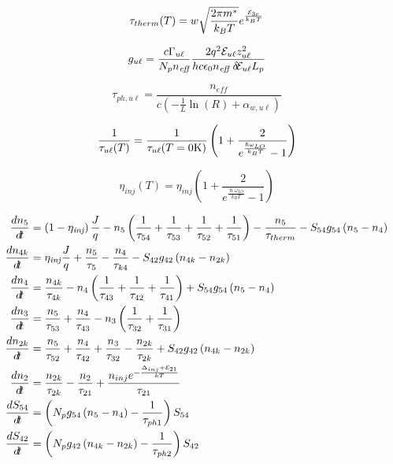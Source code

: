 \documentclass[12pt,twoside]{report}
\begin{document}
\begin{equation}
\tau_{therm}(T) = w \sqrt{\frac{2\pi m^*}{k_B T}} e^{\frac{\EE_{3c}}{k_B T}}
\end{equation}

\begin{equation}
g_{u\ell} = \frac{c \Gamma_{u\ell}}{N_p n_\textit{eff}} \frac{2 q^2 \EE_{u\ell} z_{u\ell}^2}{h c \epsilon_0 n_\textit{eff} \; \delta\!\EE_{u\ell} L_p}
\end{equation}

\begin{equation}
\tau_{ph,u\ell} = \frac{n_\textit{eff}}{c \left(-\frac{1}{L} \ln(R) + \alpha_{w,u\ell} \right)}
\end{equation}

\begin{equation}
\frac{1}{\tau_{u\ell}(T)} = \frac{1}{\tau_{u\ell}(T=0 \textnormal{K})} \left(1+\frac{2}{e^{\frac{\hslash\omega_{LO}}{k_B T}}-1}\right)
\end{equation}

\begin{equation}
\eta_{inj}(T) = \eta_{inj} \left(1+\frac{2}{e^{\frac{\hslash\omega_{LO}}{k_B T}}-1}\right)
\end{equation}

\begin{equation}
\begin{split}
\frac{d n_5}{d\!t} &=\left(1-\eta_\textit{inj}\right)\frac{J}{q}-n_5\left(\frac{1}{\tau_{54}}+\frac{1}{\tau_{53}}+\frac{1}{\tau_{52}}+\frac{1}{\tau_{51}}\right) -\frac{n_5}{\tau_{therm}} - S_{54} g_{54} \left(n_5-n_4\right)\\
\frac{d n_{4k}}{d\!t} &= \eta_\textit{inj} \frac{J}{q} + \frac{n_5}{\tau_5}-\frac{n_4}{\tau_{k4}}-S_{42} g_{42}\left(n_{4k}-n_{2k}\right)\\
\frac{d n_4}{d\!t} &= \frac{n_{4k}}{\tau_{4k}} - n_4 \left(\frac{1}{\tau_{43}}+\frac{1}{\tau_{42}}+\frac{1}{\tau_{41}}\right) + S_{54} g_{54} \left(n_5-n_4\right)\\
\frac{d n_3}{d\!t} &= \frac{n_5}{\tau_{53}}+\frac{n_4}{\tau_{43}} -n_3 \left(\frac{1}{\tau_{32}}+\frac{1}{\tau_{31}}\right)\\
\frac{d n_{2k}}{d\!t} &= \frac{n_5}{\tau_{52}}+\frac{n_4}{\tau_{42}}+\frac{n_3}{\tau_{32}}-\frac{n_{2k}}{\tau_{2k}} +S_{42} g_{42} \left(n_{4k}-n_{2k}\right)\\
\frac{d n_2}{d\!t}&= \frac{n_{2k}}{\tau_{2k}}-\frac{n_2}{\tau_{21}}+\frac{n_{inj} e^{-\frac{\Delta_{inj}+\EE_{21}}{k T}}}{\tau_{21}}\\
\frac{d S_{54}}{d\!t} &= \left(N_p g_{54}\left(n_5-n_4\right)-\frac{1}{\tau_{ph1}}\right) S_{54}\\
\frac{d S_{42}}{d\!t} &= \left(N_p g_{42}\left(n_{4k}-n_{2k}\right)-\frac{1}{\tau_{ph2}}\right) S_{42}
\end{split}
\end{equation}
\end{document}
